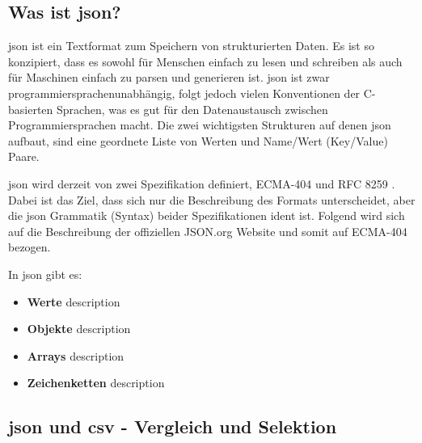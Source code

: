\subsection{Was ist \acs{json}?}
\acf{json} ist ein Textformat zum Speichern von strukturierten Daten. Es ist so konzipiert, dass es sowohl für Menschen einfach zu lesen und schreiben als auch für Maschinen einfach zu parsen und generieren ist. \acs{json} ist zwar programmiersprachenunabhängig, folgt jedoch vielen Konventionen der C-basierten Sprachen, was es gut für den Datenaustausch zwischen Programmiersprachen macht. Die zwei wichtigsten Strukturen auf denen \acs{json} aufbaut, sind eine geordnete Liste von Werten und Name/Wert (Key/Value) Paare. \cite{json_org:o.J.} 

\acs{json} wird derzeit von zwei Spezifikation definiert, ECMA-404 \cite{ECMA:2017} und RFC 8259 \cite{Bray:2017}. Dabei ist das Ziel, dass sich nur die Beschreibung des Formats unterscheidet, aber die \acs{json} Grammatik (Syntax) beider Spezifikationen ident ist. Folgend wird sich auf die Beschreibung der offiziellen JSON.org Website \cite{json_org:o.J.} und somit auf ECMA-404 \cite{ECMA:2017} bezogen.

In \acs{json} gibt es:
\begin{itemize}
	\item \textbf{Werte} description
	
	\item \textbf{Objekte} description
	
	\item \textbf{Arrays} description
	
	\item \textbf{Zeichenketten} description
\end{itemize}

\subsection{\acs{json} und \acs{csv} - Vergleich und Selektion}
\cite{SQLizer:2017}
